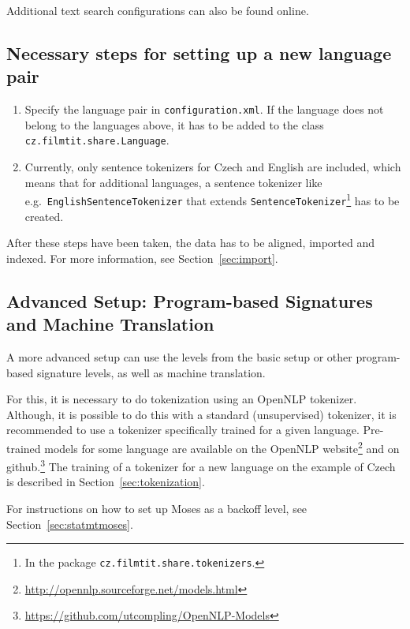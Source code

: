 Additional text search configurations can also be found online.

\subsection*{Necessary steps for setting up a new language pair}

\begin{enumerate}
	\item Specify the language pair in {\tt configuration.xml}. If the language does not belong to the languages above, it has to be added to the class {\tt cz.filmtit.share.Language}.
	\item Currently, only sentence tokenizers for Czech and English are included, which means that for additional languages, a sentence tokenizer like e.g.\ {\tt EnglishSentenceTokenizer} that extends {\tt SentenceTokenizer}\footnote{In the package {\tt cz.filmtit.share.tokenizers}.} has to be created.
\end{enumerate}

After these steps have been taken, the data has to be aligned, imported and indexed. For more information, see Section~\ref{sec:import}.


\subsection{Advanced Setup: Program-based Signatures and Machine Translation}

A more advanced setup can use the levels from the basic setup or other program-based signature levels, as well as machine translation. 

For this, it is necessary to do tokenization using an OpenNLP tokenizer. Although, it is possible to do this with a standard (unsupervised) tokenizer, it is recommended to use a tokenizer specifically trained for a given language. Pre-trained models for some language are available on the OpenNLP website\footnote{\url{http://opennlp.sourceforge.net/models.html}} and on github.\footnote{\url{https://github.com/utcompling/OpenNLP-Models}} The training of a tokenizer for a new language on the example of Czech is described in Section~\ref{sec:tokenization}. 

For instructions on how to set up Moses as a backoff level, see Section~\ref{sec:statmtmoses}.



